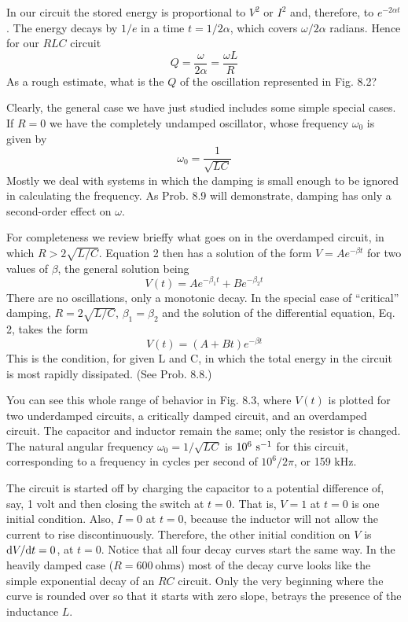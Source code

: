 
In our circuit the stored energy is proportional to $V^2$ or $I^2$ and,
therefore, to $e^{-2\alpha t}$. The energy decays by $1/e$ in a time $t = 1/2\alpha$,
which covers $\omega/2\alpha$ radians. Hence for our $RLC$ circuit
\begin{equation}
  Q = \frac{\omega}{2\alpha} = \frac{\omega L}{R}
\end{equation}
As a rough estimate, what is the $Q$ of the oscillation represented in
Fig. 8.2?

Clearly, the general case we have just studied includes some simple
special cases. If $R = 0$ we have the completely undamped oscillator,
whose frequency $\omega_0$ is given by
\begin{equation}
  \omega_0 = \frac{1}{\sqrt{LC}}
\end{equation}
Mostly we deal with systems in which the damping is small enough
to be ignored in calculating the frequency. As Prob. 8.9 will 
demonstrate, damping has only a second-order effect on $\omega$.

For completeness we review brieffy what goes on in the 
overdamped circuit, in which $R > 2\sqrt{L/C}$. Equation 2 then has a solution
of the form $V = Ae^{-\beta t}$ for two values of $\beta$, the general solution
being
\begin{equation}
  V(t) = Ae^{-\beta_1 t}+Be^{-\beta_2 t}
\end{equation}
There are no oscillations, only a monotonic decay. In the special
case of ``critical'' damping, $R = 2\sqrt{L/C}$, $\beta_1=\beta_2$ and the solution
of the differential equation, Eq. 2, takes the form
\begin{equation}
  V(t) = (A + Bt)e^{-\beta t}
\end{equation}
This is the condition, for given L and C, in which the total energy
in the circuit is most rapidly dissipated. (See Prob. 8.8.)

You can see this whole range of behavior in Fig. 8.3, where $V(t)$ is
plotted for two underdamped circuits, a critically damped circuit,
and an overdamped circuit. The capacitor and inductor remain the
same; only the resistor is changed. The natural angular frequency
$\omega_0 = 1/\sqrt{LC}$ is $10^6\ \textup{s}^{-1}$ for this circuit, corresponding to a frequency
in cycles per second of $10^6/2\pi$, or 159 kHz.

The circuit is started off by charging the capacitor to a potential
difference of, say, 1 volt and then closing the switch at $t = 0$. That
is, $V = 1$ at $t = 0$ is one initial condition. Also, $I = 0$ at $t = 0$, because
the inductor will not allow the current to rise discontinuously.
Therefore, the other initial condition on $V$ is $\textup{d} V/\textup{d} t = 0$, at $t = 0$.
Notice that all four decay curves start the same way. In the heavily
damped case ($R = 600\ \text{ohms}$) most of the decay curve looks like
the simple exponential decay of an $RC$ circuit. Only the very beginning
where the curve is rounded over so that it starts with zero slope,
betrays the presence of the inductance $L$.

